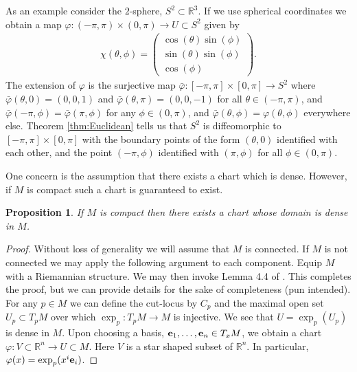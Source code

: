 \documentclass[letterpaper, 10 pt, conference]{ieeeconf}
\newcommand{\R}{\mathbb{R}}
\newtheorem{prop}[thm]{Proposition}
\begin{document}
  As an example consider the $2$-sphere, $S^2 \subset \R^3$.
  If we use spherical coordinates we obtain a map
  $\varphi: (-\pi,\pi) \times (0,\pi) \to U \subset S^2$
  given by
  \begin{align*}
    \chi(\theta,\phi) = \begin{pmatrix}
      \cos(\theta) \sin(\phi) \\
      \sin(\theta) \sin(\phi) \\
      \cos(\phi)
      \end{pmatrix}.
  \end{align*}
  The extension of $\varphi$ is the surjective map
  $\bar{\varphi}:[-\pi,\pi] \times [0,\pi] \to S^2$ where 
  $\bar{\varphi}(\theta, 0 ) = (0,0,1)$ and
  $\bar{\varphi}(\theta, \pi) = (0,0,-1)$
  for all $\theta \in (-\pi,\pi)$,
  and $\bar{\varphi}(-\pi,\phi) = \bar{\varphi}( \pi,\phi)$
  for any $\phi \in (0,\pi)$,
  and $\bar{\varphi}(\theta,\phi) = \varphi(\theta,\phi)$
  everywhere else.
  Theorem \ref{thm:Euclidean} tells us that $S^2$ is diffeomorphic
  to $[-\pi,\pi] \times [0,\pi]$ with the boundary points of the form
  $(\theta,0)$ identified with each other, and the point $(-\pi,\phi)$
  identified with $(\pi,\phi)$ for all $\phi \in (0,\pi)$.

  One concern is the assumption that there exists a chart which
  is dense.  However, if $M$ is compact such a chart is guaranteed
  to exist.

  \begin{prop}
  If $M$ is compact then there exists a chart whose domain is dense in $M$.
  \end{prop}
  \begin{proof}
  Without loss of generality we will assume that $M$ is connected.
  If $M$ is not connected we may apply the following argument to each component.
  Equip $M$ with a Riemannian structure.
  We may then invoke Lemma 4.4 of \cite{Sakai1996}.
  This completes the proof, but we can provide details for the sake of 
  completeness (pun intended).
  For any $p \in M$ we can define the cut-locus by $C_p$ and the maximal open set $U_p \subset T_p M$ over which $\exp_p : T_p M \to M$ is injective.
  We see that $U = \exp_p(U_p)$ is dense in $M$.
  Upon choosing a basis, ${\bf e}_1,\dots,{\bf e}_n \in T_xM$,
   we obtain a chart $\varphi: V \subset \mathbb{R}^n \to U \subset M$.
  Here $V$ is a star shaped subset of $\mathbb{R}^n$.
  In particular, $\varphi(x) = \exp_p ( x^i {\bf e}_i )$.
  \end{proof}
\end{document}
